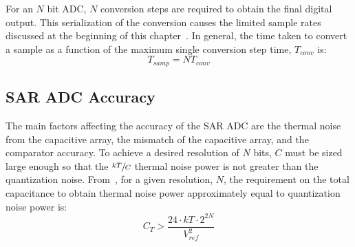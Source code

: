 For an $N$ bit ADC, $N$ conversion steps are required to obtain the final digital output. This serialization of the conversion causes the limited sample 
rates discussed at the beginning of this chapter~\cite{maximsaradc}. In general, the time taken to convert a sample as a function of the maximum single conversion step time, $T_{conv}$ is:
\begin{equation}
\label{eq:samptime}
T_{samp} = NT_{conv}
\end{equation}
\subsection{SAR ADC Accuracy}
\label{sec:saraccuracy}
The main factors affecting the accuracy of the SAR ADC are the thermal noise from the capacitive array, the mismatch of the capacitive array, and the comparator accuracy. To achieve a desired resolution of $N$ bits, $C$ must be sized large enough so that the $\sfrac{kT}{C}$ thermal noise power is not greater than the quantization noise. From~\cite{4541339}, for a given resolution, $N$, the requirement on the total capacitance to obtain thermal noise power approximately equal to quantization noise power is:
\begin{equation}
\label{eq:totalcapsize}
C_T > \dfrac{24\cdot kT\cdot 2^{2N}}{V_{ref}^2}
\end{equation}

